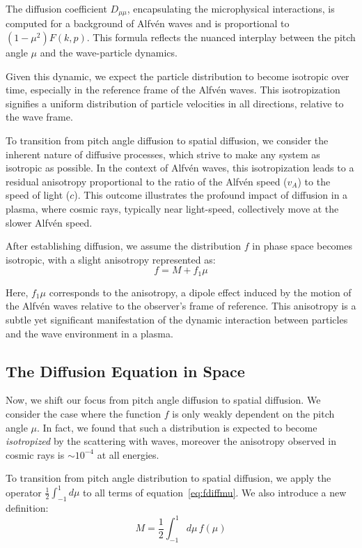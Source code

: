 The diffusion coefficient \( D_{\mu\mu} \), encapsulating the microphysical interactions, is computed for a background of Alfvén waves and is proportional to \( (1-\mu^2) F(k, p) \). This formula reflects the nuanced interplay between the pitch angle \( \mu \) and the wave-particle dynamics.

Given this dynamic, we expect the particle distribution to become isotropic over time, especially in the reference frame of the Alfvén waves. This isotropization signifies a uniform distribution of particle velocities in all directions, relative to the wave frame.

To transition from pitch angle diffusion to spatial diffusion, we consider the inherent nature of diffusive processes, which strive to make any system as isotropic as possible. In the context of Alfvén waves, this isotropization leads to a residual anisotropy proportional to the ratio of the Alfvén speed (\( v_A \)) to the speed of light (\( c \)). This outcome illustrates the profound impact of diffusion in a plasma, where cosmic rays, typically near light-speed, collectively move at the slower Alfvén speed.

After establishing diffusion, we assume the distribution \( f \) in phase space becomes isotropic, with a slight anisotropy represented as:
%
\[
f = M + f_1 \mu
\]

Here, \( f_1 \mu \) corresponds to the anisotropy, a dipole effect induced by the motion of the Alfvén waves relative to the observer's frame of reference. This anisotropy is a subtle yet significant manifestation of the dynamic interaction between particles and the wave environment in a plasma.

\subsection{The Diffusion Equation in Space}

Now, we shift our focus from pitch angle diffusion to spatial diffusion. We consider the case where the function \( f \) is only weakly dependent on the pitch angle \(\mu\). In fact, we found that such a distribution is expected to become \emph{isotropized} by the scattering with waves, moreover the anisotropy observed in cosmic rays is \( \sim 10^{-4} \) at all energies.

To transition from pitch angle distribution to spatial diffusion, we apply the operator \(\frac{1}{2}\int_{-1}^{1} d\mu\) to all terms of equation~\eqref{eq:fdiffmu}. We also introduce a new definition:
%
\begin{equation}\label{eq:Mdef}
M = \frac{1}{2}\int_{-1}^1 d\mu \, f(\mu)
\end{equation}

